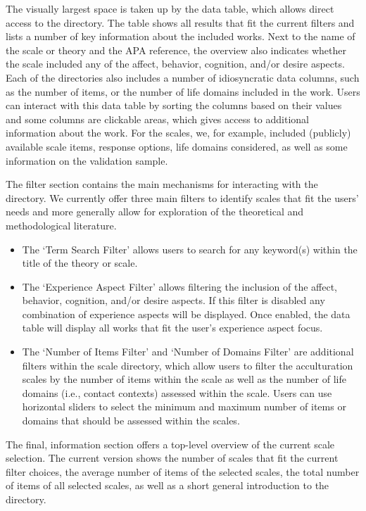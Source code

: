 \documentclass[man, 12pt, a4paper]{apa7}
\begin{document}
The visually largest space is taken up by the data table, which allows direct access to the directory. The table shows all results that fit the current filters and lists a number of key information about the included works. Next to the name of the scale or theory and the APA reference, the overview also indicates whether the scale included any of the affect, behavior, cognition, and/or desire aspects. Each of the directories also includes a number of idiosyncratic data columns, such as the number of items, or the number of life domains included in the work. Users can interact with this data table by sorting the columns based on their values and some columns are clickable areas, which gives access to additional information about the work. For the scales, we, for example, included (publicly) available scale items, response options, life domains considered, as well as some information on the validation sample.

The filter section contains the main mechanisms for interacting with the directory. We currently offer three main filters to identify scales that fit the users' needs and more generally allow for exploration of the theoretical and methodological literature.
\begin{itemize}
\item The `Term Search Filter' allows users to search for any keyword(s) within the title of the theory or scale.
\item The `Experience Aspect Filter' allows filtering the inclusion of the affect, behavior, cognition, and/or desire aspects. If this filter is disabled any combination of experience aspects will be displayed. Once enabled, the data table will display all works that fit the user's experience aspect focus.
\item The `Number of Items Filter' and `Number of Domains Filter' are additional filters within the scale directory, which allow users to filter the acculturation scales by the number of items within the scale as well as the number of life domains (i.e., contact contexts) assessed within the scale. Users can use horizontal sliders to select the minimum and maximum number of items or domains that should be assessed within the scales.
\end{itemize}

The final, information section offers a top-level overview of the current scale selection. The current version shows the number of scales that fit the current filter choices, the average number of items of the selected scales, the total number of items of all selected scales, as well as a short general introduction to the directory.

\printbibliography
\end{document}
